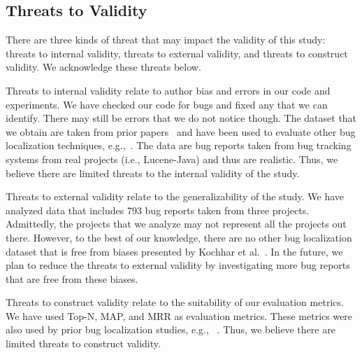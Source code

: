 \subsection{Threats to Validity}

There are three kinds of threat that may impact the validity of this study: threats to internal validity, threats to external validity, and threats to construct validity. We acknowledge these threats below.

Threats to internal validity relate to author bias and errors in our code and experiments. We have checked our code for bugs and fixed any that we can identify. There may still be errors that we do not notice though. The dataset that we obtain are taken from prior papers~\cite{zhou2012should,KochharTL14} and have been used to evaluate other bug localization techniques, e.g.,~\cite{zhou2012should,SahaLKP14,huo2016learning}. The data are bug reports taken from bug tracking systems from real projects (i.e., Lucene-Java) and thus are realistic. Thus, we believe there are limited threats to the internal validity of the study. 

Threats to external validity relate to the generalizability of the study. We have analyzed data that includes 793 bug reports taken from three projects. Admittedly, the projects that we analyze may not represent all the projects out there. However, to the best of our knowledge, there are no other bug localization dataset that is free from biases presented by Kochhar et al.~\cite{KochharTL14}. In the future, we plan to reduce the threats to external validity by investigating more bug reports that are free from these biases. %

Threats to construct validity relate to the suitability of our evaluation metrics. We have used Top-N, MAP, and MRR as evaluation metrics. These metrics were also used by prior bug localization studies, e.g.,  ~\cite{zhou2012should,SahaLKP14,huo2016learning}. Thus, we believe there are limited threats to construct validity. 